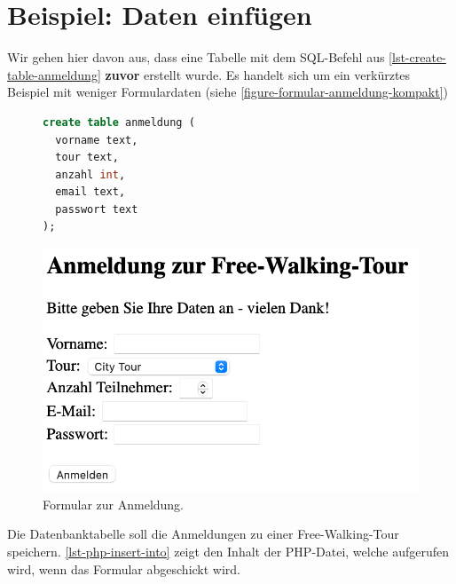 \section{Beispiel: Daten einfügen}
\label{sec-beispiel-daten-einfuegen-sql-php}

Wir gehen hier davon aus, dass eine Tabelle mit dem \ac{SQL}-Befehl aus \autoref{lst-create-table-anmeldung} \textbf{zuvor} erstellt wurde. Es handelt sich um ein verkürztes Beispiel mit weniger Formulardaten (siehe \autoref{figure-formular-anmeldung-kompakt})

\begin{figure}[htb]
\begin{minipage}{0.45\textwidth}
\centering
\begin{lstlisting}[language=SQL, basicstyle=\ttfamily\tiny, morekeywords={text, real}, caption={\protect\acs{SQL}-Befehl zur Erstellung der Tabelle \texttt{anmeldung}.}, label={lst-create-table-anmeldung}]
create table anmeldung (
  vorname text,
  tour text,
  anzahl int,
  email text,
  passwort text
);
\end{lstlisting}
\end{minipage}
\hfill
\begin{minipage}{0.45\textwidth}
\centering
\includegraphics[scale=0.25]{formular.png}
\caption{Formular zur Anmeldung.}
\label{figure-formular-anmeldung-kompakt}
\end{minipage}
\end{figure}

Die Datenbanktabelle soll die Anmeldungen zu einer Free-Walking-Tour speichern. \autoref{lst-php-insert-into} zeigt den Inhalt der \ac{PHP}-Datei, welche aufgerufen wird, wenn das Formular abgeschickt wird. 

